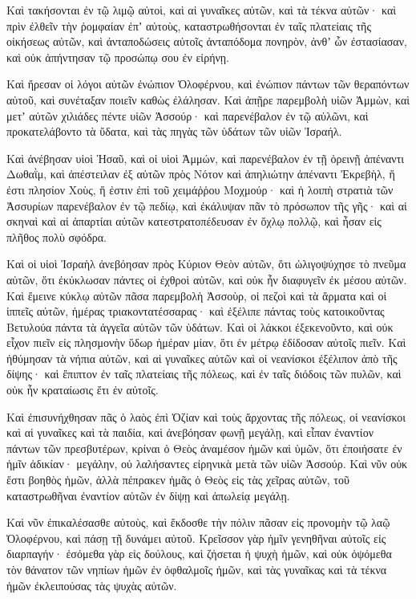 {Καὶ τακήσονται ἐν τῷ λιμῷ αὐτοὶ, καὶ αἱ γυναῖκες αὐτῶν, καὶ τὰ τέκνα αὐτῶν· καὶ πρὶν ἐλθεῖν τὴν ῥομφαίαν ἐπʼ αὐτοὺς, καταστρωθήσονται ἐν ταῖς πλατείαις τῆς οἰκήσεως αὐτῶν,
καὶ ἀνταποδώσεις αὐτοῖς ἀνταπόδομα πονηρὸν, ἀνθʼ ὧν ἐστασίασαν, καὶ οὐκ ἀπήντησαν τῷ προσώπῳ σου ἐν εἰρήνῃ.
\par }{\PP {}Καὶ ἤρεσαν οἱ λόγοι αὐτῶν ἐνώπιον Ὀλοφέρνου, καὶ ἐνώπιον πάντων τῶν θεραπόντων αὐτοῦ, καὶ συνέταξαν ποιεῖν καθὼς ἐλάλησαν.
Καὶ ἀπῇρε παρεμβολὴ υἱῶν Ἀμμὼν, καὶ μετʼ αὐτῶν χιλιάδες πέντε υἱῶν Ἀσσούρ· καὶ παρενέβαλον ἐν τῷ αὐλῶνι, καὶ προκατελάβοντο τὰ ὕδατα, καὶ τὰς πηγὰς τῶν ὑδάτων τῶν υἱῶν Ἰσραήλ.
\par }{\PP {}Καὶ ἀνέβησαν υἱοὶ Ἡσαῦ, καὶ οἱ υἱοὶ Ἀμμών, καὶ παρενέβαλον ἐν τῇ ὀρεινῇ ἀπέναντι Δωθαῒμ, καὶ ἀπέστειλαν ἐξ αὐτῶν πρὸς Νότον καὶ ἀπηλιώτην ἀπέναντι Ἐκρεβὴλ, ἥ ἐστι πλησίον Χοὺς, ἥ ἐστιν ἐπὶ τοῦ χειμάῤῥου Μοχμούρ· καὶ ἡ λοιπὴ στρατιὰ τῶν Ἀσσυρίων παρενέβαλον ἐν τῷ πεδίῳ, καὶ ἐκάλυψαν πᾶν τὸ πρόσωπον τῆς γῆς· καὶ αἱ σκηναὶ καὶ αἱ ἀπαρτίαι αὐτῶν κατεστρατοπέδευσαν ἐν ὄχλῳ πολλῷ, καὶ ἦσαν εἰς πλῆθος πολὺ σφόδρα.
\par }{\PP {}Καὶ οἱ υἱοὶ Ἰσραὴλ ἀνεβόησαν πρὸς Κύριον Θεὸν αὐτῶν, ὅτι ὠλιγοψύχησε τὸ πνεῦμα αὐτῶν, ὅτι ἐκύκλωσαν πάντες οἱ ἐχθροὶ αὐτῶν, καὶ οὐκ ἦν διαφυγεῖν ἐκ μέσου αὐτῶν.
Καὶ ἔμεινε κύκλῳ αὐτῶν πᾶσα παρεμβολὴ Ἀσσοὺρ, οἱ πεζοὶ καὶ τὰ ἅρματα καὶ οἱ ἱππεῖς αὐτῶν, ἡμέρας τριακοντατέσσαρας· καὶ ἐξέλιπε πάντας τοὺς κατοικοῦντας Βετυλούα πάντα τὰ ἀγγεῖα αὐτῶν τῶν ὑδάτων.
Καὶ οἱ λάκκοι ἐξεκενοῦντο, καὶ οὐκ εἶχον πιεῖν εἰς πλησμονὴν ὕδωρ ἡμέραν μίαν, ὅτι ἐν μέτρῳ ἐδίδοσαν αὐτοῖς πιεῖν.
Καὶ ἠθύμησαν τὰ νήπια αὐτῶν, καὶ αἱ γυναῖκες αὐτῶν καὶ οἱ νεανίσκοι ἐξέλιπον ἀπὸ τῆς δίψης· καὶ ἔπιπτον ἐν ταῖς πλατείαις τῆς πόλεως, καὶ ἐν ταῖς διόδοις τῶν πυλῶν, καὶ οὐκ ἦν κραταίωσις ἔτι ἐν αὐτοῖς.
\par }{\PP {}Καὶ ἐπισυνήχθησαν πᾶς ὁ λαὸς ἐπὶ Ὀζίαν καὶ τοὺς ἄρχοντας τῆς πόλεως, οἱ νεανίσκοι καὶ αἱ γυναῖκες καὶ τὰ παιδία, καὶ ἀνεβόησαν φωνῇ μεγάλῃ, καὶ εἶπαν ἐναντίον πάντων τῶν πρεσβυτέρων,
κρίναι ὁ Θεὸς ἀναμέσον ἡμῶν καὶ ὑμῶν, ὅτι ἐποιήσατε ἐν ἡμῖν ἀδικίαν· μεγάλην, οὐ λαλήσαντες εἰρηνικὰ μετὰ τῶν υἱῶν Ἀσσούρ.
Καὶ νῦν οὐκ ἔστι βοηθὸς ἡμῶν, ἀλλὰ πέπρακεν ἡμᾶς ὁ Θεὸς εἰς τὰς χεῖρας αὐτῶν, τοῦ καταστρωθῆναι ἐναντίον αὐτῶν ἐν δίψῃ καὶ ἀπωλείᾳ μεγάλῃ.
\par }{\PP {}Καὶ νῦν ἐπικαλέσασθε αὐτοὺς, καὶ ἔκδοσθε τὴν πόλιν πᾶσαν εἰς προνομὴν τῷ λαῷ Ὀλοφέρνου, καὶ πάσῃ τῇ δυνάμει αὐτοῦ.
Κρεῖσσον γὰρ ἡμῖν γενηθῆναι αὐτοῖς εἰς διαρπαγήν· ἐσόμεθα γὰρ εἰς δούλους, καὶ ζήσεται ἡ ψυχὴ ἡμῶν, καὶ οὐκ ὀψόμεθα τὸν θάνατον τῶν νηπίων ἡμῶν ἐν ὀφθαλμοῖς ἡμῶν, καὶ τὰς γυναῖκας καὶ τὰ τέκνα ἡμῶν ἐκλειπούσας τὰς ψυχὰς αὐτῶν.
}
